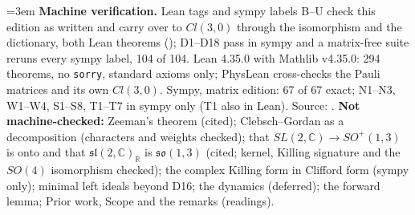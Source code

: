 \documentclass[10pt]{article}
\newcommand{\Cp}{\mathbb{C}}
\newcommand{\lean}[1]{\texttt{\detokenize{#1}}}
\begin{document}
\vspace{2pt}
{\footnotesize
\emergencystretch=3em \textbf{Machine verification.} Lean tags and sympy labels B--U check this edition as written and carry over to $Cl(3,0)$ through the isomorphism and the dictionary, both Lean theorems (\lean{dict_N}); D1--D18 pass in sympy and a matrix-free suite reruns every sympy label, 104 of 104. Lean 4.35.0 with Mathlib v4.35.0: 294 theorems, no \texttt{sorry}, standard axioms only; PhysLean cross-checks the Pauli matrices and its own $Cl(3,0)$. Sympy, matrix edition: 67 of 67 exact; N1--N3, W1--W4, S1--S8, T1--T7 in sympy only (T1 also in Lean). Source: \texttt{}.
\textbf{Not machine-checked:} Zeeman's theorem (cited); Clebsch--Gordan as a decomposition (characters and weights checked); that $SL(2,\Cp)\to SO^+(1,3)$ is onto and that $\mathfrak{sl}(2,\Cp)_{\mathbb R}$ is $\mathfrak{so}(1,3)$ (cited; kernel, Killing signature and the $SO(4)$ isomorphism checked); the complex Killing form in Clifford form (sympy only); minimal left ideals beyond D16; the dynamics (deferred); the forward lemma; Prior work, Scope and the remarks (readings).\par}
\end{document}
